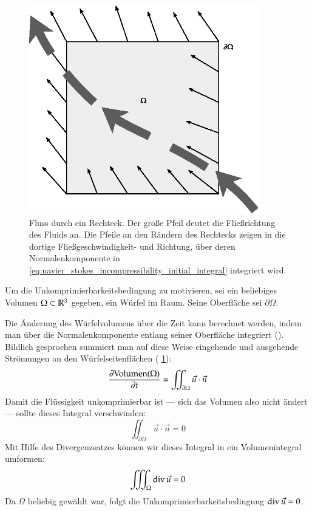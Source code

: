 \begin{figure}[ht]
\centering
\includegraphics[width=10cm]{images/incompressibility_condition_example}
\caption{Fluss durch ein Rechteck. Der große Pfeil deutet die Fließrichtung des Fluids an. Die Pfeile an den Rändern des Rechtecks zeigen in die dortige Fließgeschwindigkeit- und Richtung, über deren Normalenkomponente in \cref{eq:navier_stokes_incompressibility_initial_integral} integriert wird.}
\label{fig:navier_stokes_incompressibility_condition_example}
\end{figure}

Um die Unkomprimierbarkeitsbedingung zu motivieren, sei ein beliebiges Volumen
$\Omega \subset \mathbb{R}^3$ gegeben, \PimiddyzB{} ein Würfel im Raum. Seine
Oberfläche sei $\partial \Omega$.

Die Änderung des Würfelvolumens über die Zeit kann berechnet werden,
indem man über die Normalenkomponente entlang seiner Oberfläche
integriert (\cite{Chorin1980}). Bildlich gesprochen summiert man auf
diese Weise eingehende und ausgehende Strömungen an den
Würfelseitenflächen (\Pimiddyvgl{}
\cref{fig:navier_stokes_incompressibility_condition_example}):
\begin{equation}
\label{eq:navier_stokes_incompressibility_initial_integral}
\frac{
	\partial \textnormal{Volumen}(\Omega)
}
{
	\partial t
}
=
\iint_{\partial \Omega} \vec{u} \cdot \vec{n}
\end{equation}
Damit die Flüssigkeit unkomprimierbar ist --- sich das Volumen also
nicht ändert --- sollte dieses Integral verschwinden:
\begin{equation}
\iint_{\partial \Omega} \vec{u} \cdot \vec{n} = 0
\end{equation}
Mit Hilfe des Divergenzsatzes können wir dieses Integral in ein Volumenintegral
umformen:
\begin{equation}
\iiint_\Omega \operatorname*{div} \vec{u} = 0
\end{equation}
Da $\Omega$ beliebig gewählt war, folgt die
Unkomprimierbarkeitsbedingung $\operatorname*{div} \vec{u} = 0$.
